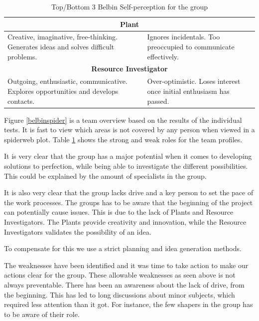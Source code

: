 \begin{table}[ht]
\begin{tabular}{|p{}|p{}|}
\multicolumn{2}{|c|}{\textbf{Plant}}                                                                                                                                             \\ \hline
Creative, imaginative, free-thinking. Generates ideas and solves difficult problems.              & Ignores incidentals. Too preoccupied to communicate effectively.             \\ \hline
\multicolumn{2}{|c|}{\textbf{Resource Investigator}}                                                                                                                             \\ \hline
Outgoing, enthusiastic, communicative. Explores opportunities and develops contacts.              & Over-optimistic. Loses interest once initial enthusiasm has passed.          \\ \hline
\end{tabular}
\caption{Top/Bottom 3 Belbin Self-perception for the group}
\label{belbintable}
\end{table}

Figure \ref{belbinspider} is a team overview based on the results of the individual tests. 
It is fast to view which areas is not covered by any person when viewed in a spiderweb plot.
Table \ref{belbintable} shows the strong and weak roles for the team profiles.

It is very clear that the group has a major potential when it comes to developing solutions to perfection, while being able to investigate the different possibilities. 
This could be explained by the amount of specialists in the group.

It is also very clear that the group lacks drive and a key person to set the pace of the work processes. 
The groups has to be aware that the beginning of the project can potentially cause issues. 
This is due to the lack of Plants and Resource Investigators. 
The Plants provide creativity and innovation, while the Resource Investigators validates the possibility of an idea.

To compensate for this we use a strict planning and idea generation methods.

The weaknesses have been identified and it was time to take action to make our actions clear for the group. 
These allowable weaknesses as seen above is not always preventable. 
There has been an awareness about the lack of drive, from the beginning. 
This has led to long discussions about minor subjects, which required less attention than it got. 
For instance, the few shapers in the group has to be aware of their role. 

